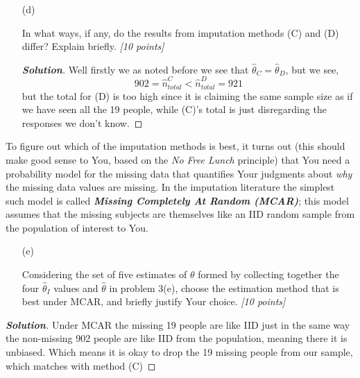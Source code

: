 \documentclass[12pt]{article}
\newenvironment{solution}{\begin{proof}[\textbf{\textit{Solution}}] }{\end{proof}}
\begin{document}
\begin{itemize}
\begin{itemize}
\vspace*{0.5in}

\item[(d)]

In what ways, if any, do the results from imputation methods (C) and (D) differ? Explain briefly. \textit{[10 points]}
\begin{tcolorbox}
    \begin{solution}
        Well firstly we as noted before we see that $\hat{\theta}_C = \hat{\theta}_D$, but we see, 
        \[902 = \hat{n}_{total}^C < \hat{n}_{total}^D = 921 \] but the total for (D) is too high since it is claiming the same sample size as if we have seen all the 19 people, while (C)'s total is just disregarding the responses we don't know. 
    \end{solution}
\end{tcolorbox}


\vspace*{0.5in}

\end{itemize}

To figure out which of the imputation methods is best, it turns out (this should make good sense to You, based on the \textit{No Free Lunch} principle) that You need a probability model for the missing data that quantifies Your judgments about \textit{why} the missing data values are missing. In the imputation literature the simplest such model is called \textbf{\textit{Missing Completely At Random (MCAR)}}; this model assumes that the missing subjects are themselves like an IID random sample from the population of interest to You.

\begin{itemize}

\item[(e)]

Considering the set of five estimates of $\theta$ formed by collecting together the four 
$\hat{ \theta }_I$ values and $\hat{ \theta }$ in problem 3(e), choose the estimation method that is best under MCAR, and briefly justify Your choice. \textit{[10 points]}

\end{itemize}

\begin{tcolorbox}
    \begin{solution}
        Under MCAR the missing 19 people are like IID just in the same way the non-missing 902 people are like IID from the population, meaning there it is unbiased. Which means it is okay to drop the 19 missing people from our sample, which matches with method (C)
    \end{solution}
\end{tcolorbox}


\end{itemize}
\end{document}
